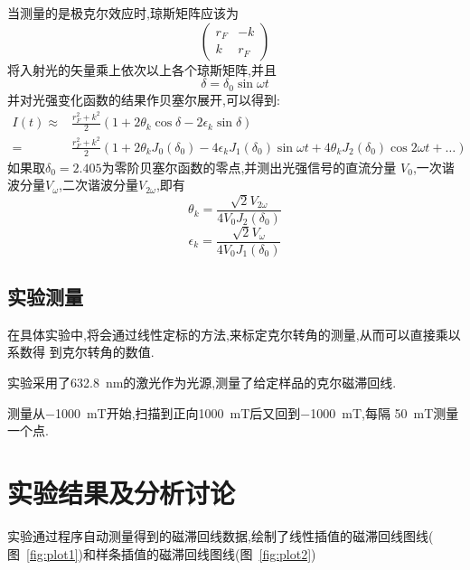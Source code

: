 \documentclass[aps,pre,12pt,preprint,onecolumn,showpacs,showkeys]{revtex4-1}
\begin{document}
当测量的是极克尔效应时,琼斯矩阵应该为
\begin{equation}
    \begin{pmatrix}
        r_F & -k \\
        k & r_F
    \end{pmatrix}
\end{equation}
将入射光的矢量乘上依次以上各个琼斯矩阵,并且
\begin{equation}
    \delta = \delta_0 \sin{\omega t}
\end{equation}
并对光强变化函数的结果作贝塞尔展开,可以得到:
\begin{equation}
    \begin{split}
        I(t) \approx  & \frac{r_F^2 + k^2}{2}(1 + 2\theta_k\cos{\delta} -
        2\epsilon_k\sin{\delta}) \\
         = & \frac{r_F^2 + k^2}{2}(1 + 2\theta_kJ_0(\delta_0) -
         4\epsilon_kJ_1(\delta_0)\sin{\omega t} +
         4\theta_kJ_2(\delta_0)\cos{2\omega t} + \dots)
    \end{split}
\end{equation}
如果取$\delta_0 = \num{2.405}$为零阶贝塞尔函数的零点,并测出光强信号的直流分量
$V_0$,一次谐波分量$V_{\omega}$,二次谐波分量$V_{2\omega}$,即有
\begin{equation}
    \theta_k = \frac{\sqrt{2}V_{2\omega}}{4V_0J_2(\delta_0)}
\end{equation}
\begin{equation}
    \epsilon_k = \frac{\sqrt{2}V_{\omega}}{4V_0J_1(\delta_0)}
\end{equation}

\subsection{实验测量}

在具体实验中,将会通过线性定标的方法,来标定克尔转角的测量,从而可以直接乘以系数得
到克尔转角的数值.

实验采用了\SI{632.8}{nm}的激光作为光源,测量了给定样品的克尔磁滞回线.

测量从\SI{-1000}{mT}开始,扫描到正向\SI{1000}{mT}后又回到\SI{-1000}{mT},每隔
\SI{50}{mT}测量一个点.

\section{实验结果及分析讨论}

实验通过程序自动测量得到的磁滞回线数据,绘制了线性插值的磁滞回线图线(
图~\ref{fig:plot1})和样条插值的磁滞回线图线(图~\ref{fig:plot2})
\end{document}
